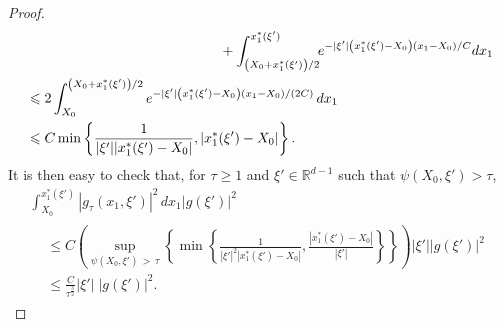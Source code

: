 \documentclass[AHL,Unicode,longabstracts]{cedram}
\newcommand*\R{\mathbb{R}}
\renewcommand{\leq}{\leqslant}
\renewcommand{\geq}{\geqslant}
\begin{document}
\begin{proof}
\begin{multline*}
\begin{aligned}
&\mkern250mu
 + 
\int_{\left(X_0+x_1^*(\xi')\right)/2}^{x_1^*(\xi')} \!\!e^{- |\xi'| \left(x_1^*(\xi') - X_0\right) (x_1- X_0)/C} dx_1
\\
& \leq 2 \int_{X_0}^{\left(X_0+x_1^*(\xi')\right)/2}e^{- |\xi'| \left(x_1^*(\xi') - X_0\right) (x_1 -X_0)/(2C)} \, dx_1
\\
& \leq C \min\left\{\frac{1}{|\xi'| |x_1^*(\xi')- X_0|}, \left|x_1^*(\xi')- X_0\right| \right\}.
\end{aligned}
\end{multline*}
It is then easy to check that, for $\tau \geq 1$ and $\xi' \in \R^{d-1}$ such that $\psi(X_0, \xi') > \tau$,
\begin{multline*}
\int_{X_0}^{x_1^*(\xi')} \left|g_\tau(x_1, \xi')\right|^2 \, dx_1 |g(\xi')|^2
\\
\begin{aligned}
&\leq C
\left(\!\sup_{\psi(X_0, \xi')\, >\,\tau}
\left\{
\min\left\{\frac{1}{|\xi'|^2 |x_1^*(\xi')- X_0|}, \frac{|x_1^*(\xi')\!-\! X_0|}{|\xi'|} \right\}
\right\} \right) |\xi'| |g(\xi')|^2\\
&\leq
\frac{C}{\tau^{\frac{3}{2}}} \left|\xi'\right|\; |g(\xi')|^2.
\end{aligned}
\end{multline*}


\end{proof}
\end{document}
